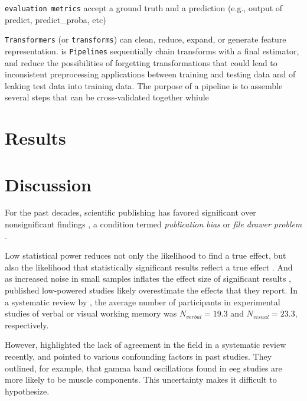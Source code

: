 \texttt{evaluation metrics} accept a ground truth and a prediction (e.g., output of predict, predict\_proba, etc)

\texttt{Transformers} (or \texttt{transforms}) can clean, reduce, expand, or generate feature representation.
 is
\texttt{Pipelines} sequentially chain transforms with a final estimator, and reduce the possibilities of forgetting transformations that could lead to inconsistent preprocessing applications between training and testing data and of leaking test data into training data. The purpose of a pipeline is to assemble several steps that can be cross-validated together whiule

\section{Results}
\pagebreak

\section{Discussion}
For the past decades, scientific publishing has favored significant over nonsignificant findings \citep{dwan2008systematic}, a condition termed \textit{publication bias} or \textit{file drawer problem} \citep{rosenthal1979file}.





Low statistical power reduces not only the likelihood to find a true effect, but also the likelihood that statistically significant results reflect a true effect \citep{button2013power}.
And as increased noise in small samples inflates the effect size of significant results \citep{loken2017measurement}, published low-powered studies likely overestimate the effects that they report.
In a systematic review by \citet{pavlov2022oscillatory}, the average number of participants in experimental studies of verbal or visual working memory was $N_{verbal}=19.3$ and $N_{visual}=23.3$, respectively.

However, \citet{pavlov2022oscillatory} highlighted the lack of agreement in the field in a systematic review recently, and pointed to various confounding factors in past studies. They outlined, for example, that gamma band oscillations found in \gls{eeg} studies are more likely to be muscle components.
This uncertainty makes it difficult to hypothesize.

